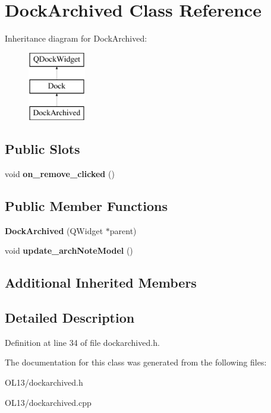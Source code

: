 \hypertarget{class_dock_archived}{}\section{Dock\+Archived Class Reference}
\label{class_dock_archived}
Inheritance diagram for Dock\+Archived\+:\begin{figure}[H]
\begin{center}
\leavevmode
\includegraphics[height=3.000000cm]{class_dock_archived}
\end{center}
\end{figure}
\subsection*{Public Slots}
\begin{DoxyCompactItemize}
\item 
\mbox{\label{class_dock_archived_ab2ec83022057fff8169784cf02876a8a}} 
void {\bfseries on\+\_\+remove\+\_\+clicked} ()
\end{DoxyCompactItemize}
\subsection*{Public Member Functions}
\begin{DoxyCompactItemize}
\item 
\mbox{\label{class_dock_archived_ad3cc1b3cbaa84fed8d37c478927c7463}} 
{\bfseries Dock\+Archived} (Q\+Widget $\ast$parent)
\item 
\mbox{\label{class_dock_archived_a557ea9fc3b685f0aefbae0bcd624cbec}} 
void {\bfseries update\+\_\+arch\+Note\+Model} ()
\end{DoxyCompactItemize}
\subsection*{Additional Inherited Members}


\subsection{Detailed Description}


Definition at line 34 of file dockarchived.\+h.



The documentation for this class was generated from the following files\+:\begin{DoxyCompactItemize}
\item 
O\+L13/dockarchived.\+h\item 
O\+L13/dockarchived.\+cpp\end{DoxyCompactItemize}

